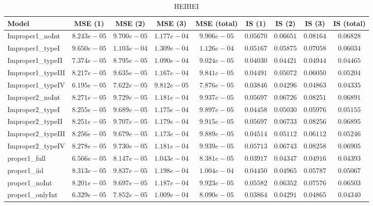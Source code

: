 \begin{table}

\caption{\label{tab:model-choice-sc2}HEIHEI}
\centering
\begin{tabular}{lcccccccc}
\hline
Model  & MSE (1) & MSE (2) & MSE (3) & MSE (total) & IS (1) & IS (2) & IS (3) & \multicolumn{1}{c}{IS (total)} \\ 
\hline
Improper1_noInt  & $8.243e-05$ & $9.700e-05$ & $1.177e-04$ & $9.906e-05$ & $0.05670$ & $0.06651$ & $0.08164$ & $0.06828$ \\
Improper1_typeI  & $9.650e-05$ & $1.103e-04$ & $1.309e-04$ & $1.126e-04$ & $0.05167$ & $0.05875$ & $0.07058$ & $0.06034$ \\
Improper1_typeII  & $7.374e-05$ & $8.795e-05$ & $1.090e-04$ & $9.024e-05$ & $0.04030$ & $0.04421$ & $0.04944$ & $0.04465$ \\
Improper1_typeIII  & $8.217e-05$ & $9.635e-05$ & $1.167e-04$ & $9.841e-05$ & $0.04491$ & $0.05072$ & $0.06050$ & $0.05204$ \\
Improper1_typeIV  & $6.195e-05$ & $7.622e-05$ & $9.812e-05$ & $7.876e-05$ & $0.03846$ & $0.04296$ & $0.04863$ & $0.04335$ \\
Improper2_noInt  & $8.271e-05$ & $9.729e-05$ & $1.181e-04$ & $9.937e-05$ & $0.05697$ & $0.06726$ & $0.08251$ & $0.06891$ \\
Improper2_typeI  & $8.255e-05$ & $9.689e-05$ & $1.175e-04$ & $9.897e-05$ & $0.04458$ & $0.05030$ & $0.05976$ & $0.05155$ \\
Improper2_typeII  & $8.251e-05$ & $9.707e-05$ & $1.179e-04$ & $9.915e-05$ & $0.05697$ & $0.06733$ & $0.08256$ & $0.06895$ \\
Improper2_typeIII  & $8.256e-05$ & $9.679e-05$ & $1.173e-04$ & $9.889e-05$ & $0.04514$ & $0.05112$ & $0.06112$ & $0.05246$ \\
Improper2_typeIV  & $8.278e-05$ & $9.730e-05$ & $1.181e-04$ & $9.939e-05$ & $0.05713$ & $0.06743$ & $0.08258$ & $0.06905$ \\
proper1_full  & $6.566e-05$ & $8.147e-05$ & $1.043e-04$ & $8.381e-05$ & $0.03917$ & $0.04347$ & $0.04916$ & $0.04393$ \\
proper1_iid  & $8.313e-05$ & $9.837e-05$ & $1.198e-04$ & $1.004e-04$ & $0.04450$ & $0.04965$ & $0.05787$ & $0.05067$ \\
proper1_noInt  & $8.201e-05$ & $9.697e-05$ & $1.187e-04$ & $9.923e-05$ & $0.05582$ & $0.06352$ & $0.07576$ & $0.06503$ \\
proper1_onlyInt  & $6.329e-05$ & $7.852e-05$ & $1.009e-04$ & $8.090e-05$ & $0.03864$ & $0.04291$ & $0.04865$ & $0.04340$ \\

\end{tabular}
\end{table}
